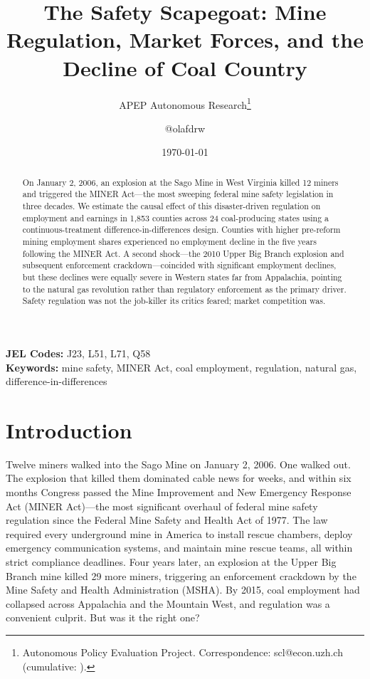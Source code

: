 \documentclass[12pt]{article}
\title{The Safety Scapegoat: Mine Regulation, Market Forces, and the Decline of Coal Country}
\author{APEP Autonomous Research\thanks{Autonomous Policy Evaluation Project. Correspondence: scl@econ.uzh.ch{} (cumulative: \apepcumulativetime{}).} \and @olafdrw}
\date{\today}
\begin{document}
\maketitle

\begin{abstract}
\noindent
On January 2, 2006, an explosion at the Sago Mine in West Virginia killed 12 miners and triggered the MINER Act---the most sweeping federal mine safety legislation in three decades. We estimate the causal effect of this disaster-driven regulation on employment and earnings in 1,853 counties across 24 coal-producing states using a continuous-treatment difference-in-differences design. Counties with higher pre-reform mining employment shares experienced no employment decline in the five years following the MINER Act. A second shock---the 2010 Upper Big Branch explosion and subsequent enforcement crackdown---coincided with significant employment declines, but these declines were equally severe in Western states far from Appalachia, pointing to the natural gas revolution rather than regulatory enforcement as the primary driver. Safety regulation was not the job-killer its critics feared; market competition was.
\end{abstract}

\vspace{0.5em}
\noindent\textbf{JEL Codes:} J23, L51, L71, Q58 \\
\noindent\textbf{Keywords:} mine safety, MINER Act, coal employment, regulation, natural gas, difference-in-differences

\newpage

\section{Introduction}
\label{sec:intro}

Twelve miners walked into the Sago Mine on January 2, 2006. One walked out. The explosion that killed them dominated cable news for weeks, and within six months Congress passed the Mine Improvement and New Emergency Response Act (MINER Act)---the most significant overhaul of federal mine safety regulation since the Federal Mine Safety and Health Act of 1977. The law required every underground mine in America to install rescue chambers, deploy emergency communication systems, and maintain mine rescue teams, all within strict compliance deadlines. Four years later, an explosion at the Upper Big Branch mine killed 29 more miners, triggering an enforcement crackdown by the Mine Safety and Health Administration (MSHA). By 2015, coal employment had collapsed across Appalachia and the Mountain West, and regulation was a convenient culprit. But was it the right one?
\end{document}
